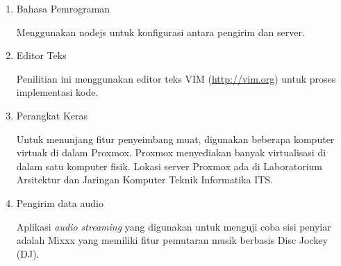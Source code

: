 \begin{enumerate}
    \item Bahasa Pemrograman
    
    Menggunakan nodejs untuk konfigurasi antara pengirim dan server.
    
    \item Editor Teks
    
    Penilitian ini menggunakan editor teks VIM (\url{http://vim.org}) untuk proses implementasi kode.
    
    \item Perangkat Keras
    
    Untuk menunjang fitur penyeimbang muat, digunakan beberapa komputer virtuak di dalam Proxmox. Proxmox menyediakan banyak virtualisasi di dalam satu komputer fisik. Lokasi server Proxmox ada di Laboratorium Arsitektur dan Jaringan Komputer Teknik Informatika ITS.
    
    \item Pengirim data audio
    
    Aplikasi \textit{audio streaming} yang digunakan untuk menguji coba sisi penyiar adalah Mixxx yang memiliki fitur pemutaran musik berbasis Disc Jockey (DJ).
    \end{enumerate}
